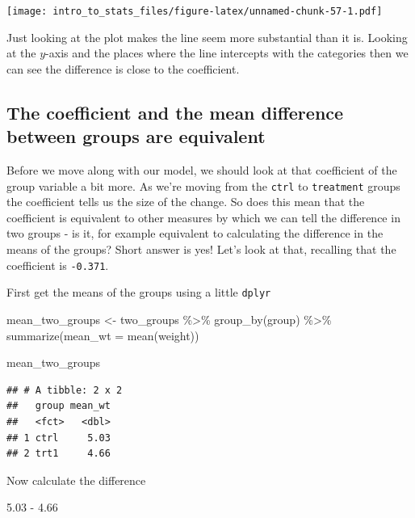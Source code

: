 \documentclass[
]{book}
\newenvironment{Shaded}{\begin{snugshade}}{\end{snugshade}}
\newcommand{\AttributeTok}[1]{\textcolor[rgb]{0.77,0.63,0.00}{#1}}
\newcommand{\FloatTok}[1]{\textcolor[rgb]{0.00,0.00,0.81}{#1}}
\newcommand{\FunctionTok}[1]{\textcolor[rgb]{0.00,0.00,0.00}{#1}}
\newcommand{\NormalTok}[1]{#1}
\newcommand{\OtherTok}[1]{\textcolor[rgb]{0.56,0.35,0.01}{#1}}
\newcommand{\SpecialCharTok}[1]{\textcolor[rgb]{0.00,0.00,0.00}{#1}}
\begin{document}
\texttt{[image: intro\_to\_stats\_files/figure-latex/unnamed-chunk-57-1.pdf]}

Just looking at the plot makes the line seem more substantial than it is. Looking at the \(y\)-axis and the places where the line intercepts with the categories then we can see the difference is close to the coefficient.

\hypertarget{the-coefficient-and-the-mean-difference-between-groups-are-equivalent}{%
\subsection{The coefficient and the mean difference between groups are equivalent}\label{the-coefficient-and-the-mean-difference-between-groups-are-equivalent}}

Before we move along with our model, we should look at that coefficient of the group variable a bit more. As we're moving from the \texttt{ctrl} to \texttt{treatment} groups the coefficient tells us the size of the change. So does this mean that the coefficient is equivalent to other measures by which we can tell the difference in two groups - is it, for example equivalent to calculating the difference in the means of the groups? Short answer is yes! Let's look at that, recalling that the coefficient is \texttt{-0.371}.

First get the means of the groups using a little \texttt{dplyr}

\begin{Shaded}
\begin{Highlighting}[]
\NormalTok{mean\_two\_groups }\OtherTok{\textless{}{-}}\NormalTok{ two\_groups }\SpecialCharTok{\%\textgreater{}\%} 
  \FunctionTok{group\_by}\NormalTok{(group) }\SpecialCharTok{\%\textgreater{}\%} 
  \FunctionTok{summarize}\NormalTok{(}\AttributeTok{mean\_wt =} \FunctionTok{mean}\NormalTok{(weight))}

\NormalTok{mean\_two\_groups}
\end{Highlighting}
\end{Shaded}

\begin{verbatim}
## # A tibble: 2 x 2
##   group mean_wt
##   <fct>   <dbl>
## 1 ctrl     5.03
## 2 trt1     4.66
\end{verbatim}

Now calculate the difference

\begin{Shaded}
\begin{Highlighting}[]
\FloatTok{5.03} \SpecialCharTok{{-}} \FloatTok{4.66}
\end{Highlighting}
\end{Shaded}
\end{document}
